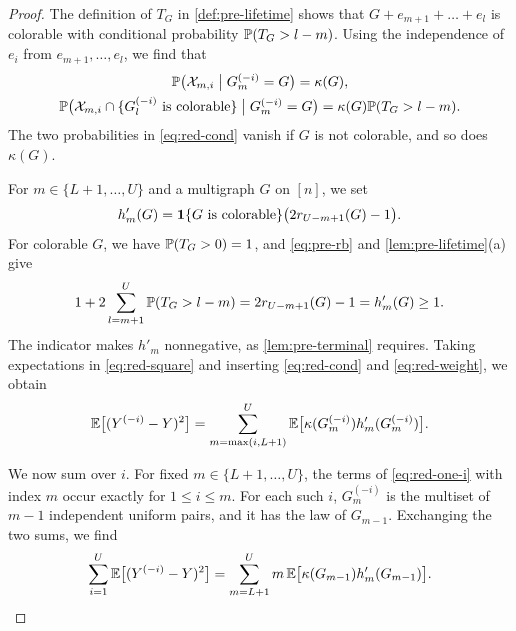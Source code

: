 \begin{proof}
The definition of $T_G$ in \cref{def:pre-lifetime} shows that $G + e_{m + 1} + \dots + e_l$ is colorable with conditional probability $\mathbb P(T_G > l - m)$. Using the independence of $e_i$ from $e_{m + 1}, \dots, e_l$, we find that
\begin{equation}\label{eq:red-cond}
\begin{gathered}
\mathbb P\bigl(\mathcal X_{m, i} \bigm| G_m^{(-i)} = G\bigr) = \kappa(G), \\
\mathbb P\bigl(\mathcal X_{m, i} \cap \{G_l^{(-i)} \text{ is colorable}\} \bigm| G_m^{(-i)} = G\bigr) = \kappa(G) \mathbb P(T_G > l - m).
\end{gathered}
\end{equation}
The two probabilities in \eqref{eq:red-cond} vanish if $G$ is not colorable, and so does $\kappa(G)$.

For $m \in \{L + 1, \dots, U\}$ and a multigraph $G$ on $[n]$, we set
\begin{equation*}
h'_m(G) = \mathbf 1\{G \text{ is colorable}\} \bigl(2 r_{U - m + 1}(G) - 1\bigr).
\end{equation*}
For colorable $G$, we have $\mathbb P(T_G > 0) = 1$, and \eqref{eq:pre-rb} and \cref{lem:pre-lifetime}(a) give
\begin{equation}\label{eq:red-weight}
1 + 2 \sum_{l = m + 1}^{U} \mathbb P(T_G > l - m) = 2 r_{U - m + 1}(G) - 1 = h'_m(G) \ge 1.
\end{equation}
The indicator makes $h'_m$ nonnegative, as \cref{lem:pre-terminal} requires. Taking expectations in \eqref{eq:red-square} and inserting \eqref{eq:red-cond} and \eqref{eq:red-weight}, we obtain
\begin{equation}\label{eq:red-one-i}
\mathbb E\bigl[(Y^{(-i)} - Y)^2\bigr] = \sum_{m = \max(i, L + 1)}^{U} \mathbb E\bigl[\kappa(G_m^{(-i)}) h'_m(G_m^{(-i)})\bigr].
\end{equation}

We now sum over $i$. For fixed $m \in \{L + 1, \dots, U\}$, the terms of \eqref{eq:red-one-i} with index $m$ occur exactly for $1 \le i \le m$. For each such $i$, $G_m^{(-i)}$ is the multiset of $m - 1$ independent uniform pairs, and it has the law of $G_{m - 1}$. Exchanging the two sums, we find
\begin{equation}\label{eq:red-sum-i}
\sum_{i = 1}^{U} \mathbb E\bigl[(Y^{(-i)} - Y)^2\bigr] = \sum_{m = L + 1}^{U} m \, \mathbb E\bigl[\kappa(G_{m - 1}) h'_m(G_{m - 1})\bigr].
\end{equation}


\end{proof}
